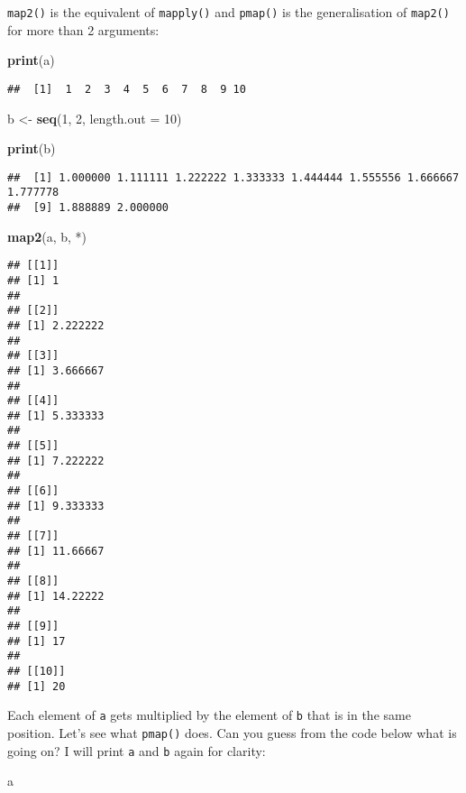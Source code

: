 \documentclass[
]{article}
\newenvironment{Shaded}{\begin{snugshade}}{\end{snugshade}}
\newcommand{\DataTypeTok}[1]{\textcolor[rgb]{0.13,0.29,0.53}{#1}}
\newcommand{\DecValTok}[1]{\textcolor[rgb]{0.00,0.00,0.81}{#1}}
\newcommand{\KeywordTok}[1]{\textcolor[rgb]{0.13,0.29,0.53}{\textbf{#1}}}
\newcommand{\NormalTok}[1]{#1}
\newcommand{\StringTok}[1]{\textcolor[rgb]{0.31,0.60,0.02}{#1}}
\begin{document}
\texttt{map2()} is the equivalent of \texttt{mapply()} and \texttt{pmap()} is the generalisation of \texttt{map2()} for more
than 2 arguments:

\begin{Shaded}
\begin{Highlighting}[]
\KeywordTok{print}\NormalTok{(a)}
\end{Highlighting}
\end{Shaded}

\begin{verbatim}
##  [1]  1  2  3  4  5  6  7  8  9 10
\end{verbatim}

\begin{Shaded}
\begin{Highlighting}[]
\NormalTok{b \textless{}{-}}\StringTok{ }\KeywordTok{seq}\NormalTok{(}\DecValTok{1}\NormalTok{, }\DecValTok{2}\NormalTok{, }\DataTypeTok{length.out =} \DecValTok{10}\NormalTok{)}

\KeywordTok{print}\NormalTok{(b)}
\end{Highlighting}
\end{Shaded}

\begin{verbatim}
##  [1] 1.000000 1.111111 1.222222 1.333333 1.444444 1.555556 1.666667 1.777778
##  [9] 1.888889 2.000000
\end{verbatim}

\begin{Shaded}
\begin{Highlighting}[]
\KeywordTok{map2}\NormalTok{(a, b, }\StringTok{\textasciigrave{}}\DataTypeTok{*}\StringTok{\textasciigrave{}}\NormalTok{)}
\end{Highlighting}
\end{Shaded}

\begin{verbatim}
## [[1]]
## [1] 1
## 
## [[2]]
## [1] 2.222222
## 
## [[3]]
## [1] 3.666667
## 
## [[4]]
## [1] 5.333333
## 
## [[5]]
## [1] 7.222222
## 
## [[6]]
## [1] 9.333333
## 
## [[7]]
## [1] 11.66667
## 
## [[8]]
## [1] 14.22222
## 
## [[9]]
## [1] 17
## 
## [[10]]
## [1] 20
\end{verbatim}

Each element of \texttt{a} gets multiplied by the element of \texttt{b} that is in the same position.
Let's see what \texttt{pmap()} does. Can you guess from the code below what is going on? I will print
\texttt{a} and \texttt{b} again for clarity:

\begin{Shaded}
\begin{Highlighting}[]
\NormalTok{a}
\end{Highlighting}
\end{Shaded}
\end{document}
